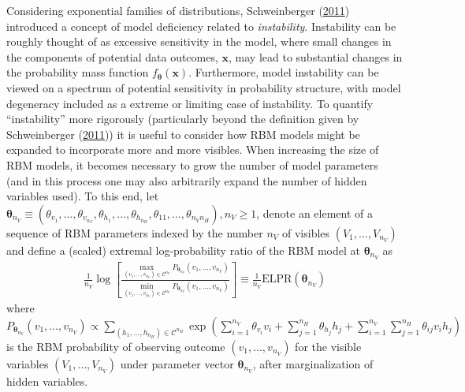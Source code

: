 \documentclass[12pt]{article}
\theoremstyle{definition}
\newcommand{\nv}{{n_{\scriptscriptstyle V}}}
\newcommand{\nh}{{n_{\scriptscriptstyle H}}}
\begin{document}
Considering exponential families of distributions, Schweinberger
(\protect\hyperlink{ref-schweinberger2011instability}{2011}) introduced
a concept of model deficiency related to \emph{instability}. Instability
can be roughly thought of as excessive sensitivity in the model, where
small changes in the components of potential data outcomes,
\(\boldsymbol x\), may lead to substantial changes in the probability
mass function \(f_{\boldsymbol \theta}(\boldsymbol x)\). Furthermore,
model instability can be viewed on a spectrum of potential sensitivity
in probability structure, with model degeneracy included as a extreme or
limiting case of instability. To quantify ``instability'' more
rigorously (particularly beyond the definition given by Schweinberger
(\protect\hyperlink{ref-schweinberger2011instability}{2011})) it is
useful to consider how RBM models might be expanded to incorporate more
and more visibles. When increasing the size of RBM models, it becomes
necessary to grow the number of model parameters (and in this process
one may also arbitrarily expand the number of hidden variables used). To
this end, let
\(\boldsymbol \theta_{\nv} \equiv (\theta_{v_1}, \dots, \theta_{v_\nv}, \theta_{h_1}, \dots, \theta_{h_\nh}, \theta_{11}, \dots, \theta_{\nv \nh}), \nv \ge 1\),
denote an element of a sequence of RBM parameters indexed by the number
\(\nv\) of visibles \((V_1, \dots, V_\nv)\) and define a (scaled)
extremal log-probability ratio of the RBM model at
\(\boldsymbol \theta_{\nv}\) as
\begin{align}
\frac{1}{\nv} \log \left[\frac{\max\limits_{(v_1, \dots, v_\nv) \in \mathcal{C}^\nv}P_{\boldsymbol \theta_\nv}(v_1, \dots, v_\nv)}{\min\limits_{(v_1, \dots, v_\nv) \in \mathcal{C}^\nv}P_{\boldsymbol \theta_\nv}(v_1, \dots, v_\nv)}\right] \equiv \frac{1}{\nv} \text{ELPR}(\boldsymbol \theta_\nv) \label{eq:elpr}
\end{align}
where
\(P_{\boldsymbol \theta_\nv}(v_1, \dots, v_\nv) \propto \sum_{(h_1, \dots, h_\nh) \in \mathcal{C}^\nh}\exp\left(\sum_{i = 1}^\nv \theta_{v_i} v_i + \sum_{j = 1}^\nh \theta_{h_j} h_j + \sum_{i = 1}^\nv \sum_{j = 1}^\nh \theta_{ij} v_i h_j\right)\)
is the RBM probability of observing outcome \((v_1, \dots, v_\nv)\) for
the visible variables \((V_1, \dots, V_\nv)\) under parameter vector
\(\boldsymbol \theta_\nv\), after marginalization of hidden variables.
\end{document}
